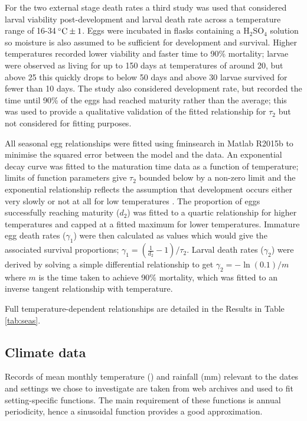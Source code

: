 For the two external stage death rates a third study was used \cite{Arene} that considered larval viability post-development and larval death rate across a temperature range of 16-34$\,^{\circ}{\rm C}\pm1$. Eggs were incubated in flasks containing a H$_2$SO$_4$ solution so moisture is also assumed to be sufficient for development and survival. Higher temperatures recorded lower viability and faster time to 90\% mortality; larvae were observed as living for up to 150 days at temperatures of around 20, but above 25 this quickly drops to below 50 days and above 30 larvae survived for fewer than 10 days. The study also considered development rate, but recorded the time until 90\% of the eggs had reached maturity rather than the average; this was used to provide a qualitative validation of the fitted relationship for $\tau_2$ but not considered for fitting purposes.

All seasonal egg relationships were fitted using fminsearch in Matlab R2015b to minimise the squared error between the model and the data. An exponential decay curve was fitted to the maturation time data as a function of temperature; limits of function parameters give $\tau_2$ bounded below by a non-zero limit and the exponential relationship reflects the assumption that development occurs either very slowly or not at all for low temperatures \cite{Kim}. The proportion of eggs successfully reaching maturity ($d_2$) was fitted to a quartic relationship for higher temperatures and capped at a fitted maximum for lower temperatures. Immature egg death rates ($\gamma_1$) were then calculated as values which would give the associated survival proportions; $\gamma_1 = (\frac{1}{d_2}-1)/\tau_2$. Larval death rates ($\gamma_2$) were derived by solving a simple differential relationship to get $\gamma_2 = -\ln{(0.1)}/m$ where $m$ is the time taken to achieve 90\% mortality, which was fitted to an inverse tangent relationship with temperature. 

Full temperature-dependent relationships are detailed in the Results in Table \ref{tab:seas}.

\subsection{Climate data}

Records of mean monthly temperature () and rainfall (mm) relevant to the dates and settings we chose to investigate are taken from web archives \cite{Ktemp,Ntemp} and used to fit setting-specific functions. The main requirement of these functions is annual periodicity, hence a sinusoidal function provides a good approximation. 

